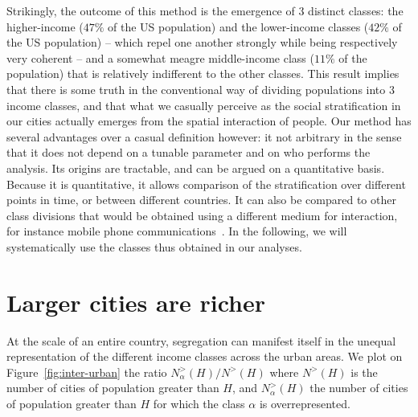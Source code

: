 Strikingly, the outcome of this method is the emergence of 3 distinct classes:
the higher-income ($47\%$ of the US population) and the lower-income classes
($42\%$ of the US population) -- which repel one another strongly while being
respectively very coherent -- and a somewhat meagre middle-income class ($11\%$
of the population) that is relatively indifferent to the other classes. This
result implies that there is some truth in the conventional way of dividing
populations into $3$ income classes, and that what we casually perceive as the
social stratification in our cities actually emerges from the spatial
interaction of people. Our method has several advantages over a casual
definition however: it not arbitrary in the sense that it does not depend on a
tunable parameter and on who performs the analysis. Its origins are tractable,
and can be argued on a quantitative basis. Because it is quantitative, it allows
comparison of the stratification over different points in time, or between
different countries. It can also be compared to other class divisions that would
be obtained using a different medium for interaction, for instance mobile phone
communications~\cite{Eagle:2010}. In the following, we will systematically use
the classes thus obtained in our analyses.



\section{Larger cities are richer}
\label{sec:inter_urban}

At the scale of an entire country, segregation can manifest itself in the
unequal representation of the different income classes across the urban areas.
We plot on Figure~\ref{fig:inter-urban} the ratio $
N_\alpha^{>}(H)/N^{>}(H)$ where $N^{>}(H)$ is the number of cities of
population greater than $H$, and $N_\alpha^{>}(H)$ the number of cities of
population greater than $H$ for which the class $\alpha$ is overrepresented.

